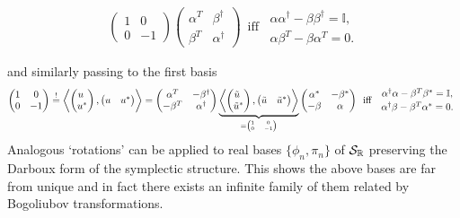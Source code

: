 \documentclass[../QFT_main.tex]{subfiles}
\begin{document}
\begin{mytheorem}
{\begin{align}
{\begin{pmatrix} 1 & 0\\0 & -1\end{pmatrix}}
\begin{pmatrix}\alpha^T & \beta^\dagger\\\beta^T & \alpha^\dagger \end{pmatrix}
\,\,\,\text{iff}\,\,\,
\begin{array}{c}\alpha\alpha^\dagger - \beta \beta^\dagger = \mathbb{I},\\[2pt] \alpha\beta^T - \beta\alpha^T = 0.\end{array}
\end{align}}
\vspace{-7mm}

\noindent
and similarly passing to the first basis
{\small\begin{align}
\begin{pmatrix} 1 & 0\\0 & -1\end{pmatrix} \overset{!}{=}
\left\langle \begin{pmatrix} u\,\,\\ u^*\end{pmatrix}, \begin{pmatrix} u & u^*\end{pmatrix}\right\rangle 
=\begin{pmatrix}\alpha^T & -\beta^\dagger\\-\beta^T & \alpha^\dagger \end{pmatrix}
\underbrace{\left\langle \begin{pmatrix} \tilde{u}\,\,\\\tilde{u}^*\end{pmatrix}, \begin{pmatrix} \tilde{u}& \tilde{u}^*\end{pmatrix}\right\rangle}_{\tiny =
\begin{pmatrix} 1 & 0\\0 & -1\end{pmatrix}}
\begin{pmatrix}\alpha^* & -\beta^*\\-\beta & \alpha \end{pmatrix}
\,\,\,\text{iff}\,\,\,
\begin{array}{c}\alpha^\dagger \alpha - \beta^T \beta^* = \mathbb{I},\\[2pt] \alpha^\dagger \beta - \beta^T \alpha^* = 0.\end{array}
\end{align}}
Analogous `rotations' can be applied to real bases $\{\phi_n,\pi_n\}$ of $\mathcal{S}_{\mathbb{R}}$ preserving the Darboux form of the symplectic structure.
This shows the above bases are far from unique and in fact there exists an infinite family of them related by Bogoliubov transformations.


\end{mytheorem}
\end{document}
